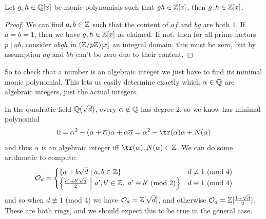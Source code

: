 \documentclass{article}
\begin{document}
\begin{lemma}
    Let $g,h\in\mathbb{Q}[x]$ be monic polynomials such that $gh\in\mathbb{Z}[x]$, then $g,h\in\mathbb{Z}[x]$.
    \begin{proof}
        We can find $a,b\in\mathbb{Z}$ such that the content of $af$ and $bg$ are both $1$. If $a=b=1$, then we have $g,h\in\mathbb{Z}[x]$ as claimed. If not, then for all prime factors $p\mid ab$, consider $abgh$ in $(\mathbb{Z}/p\mathbb{Z})[x]$ an integral domain, this must be zero, but by assumption $ag$ and $bh$ can't be zero due to their content.
    \end{proof}
\end{lemma}

So to check that a number is an algebraic integer we just have to find its minimal monic polynomial. This lets us easily determine exactly which $\alpha\in\mathbb{Q}$ are algebraic integers, just the actual integers.

In the quadratic field $\mathbb{Q}(\sqrt{d})$, every $\alpha\notin\mathbb{Q}$ has degree $2$, so we know has minimal polynomial \[
0=\alpha^2 - (\alpha+\overline{\alpha})\alpha + \alpha\overline{\alpha} = \alpha^2 - \tr(\alpha)\alpha + N(\alpha)
\] and thus $\alpha$ is an algebraic integer iff $\tr(\alpha),N(\alpha)\in\bZ$. We can do some arithmetic to compute: \[
\mathcal{O}_d = \begin{cases}
    \{a+b\sqrt{d} \mid a,b\in\mathbb{Z}\} & d\not\equiv 1 \ (\text{mod }4)\\
    \left\{\frac{a'+b'\sqrt{d}}{2}\ \middle|\ a',b'\in\mathbb{Z}, \ a'\equiv b' \ (\text{mod } 2)\right\}& d\equiv 1 \ (\text{mod }4)
\end{cases}
\] and so when $d\not\equiv 1$ (mod $4$) we have $\mathcal{O}_d=\mathbb{Z}[\sqrt{d}]$, and otherwise $\mathcal{O}_d=\mathbb{Z}[\frac{1+\sqrt{d}}{2}]$. These are both rings, and we should expect this to be true in the general case.
\end{document}
